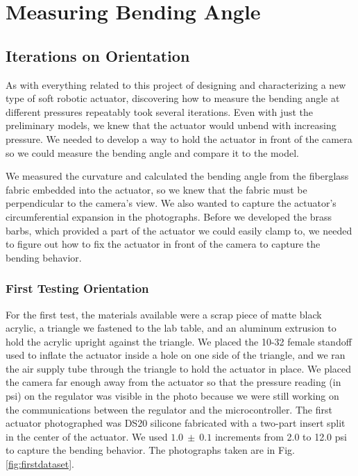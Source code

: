 \chapter{Measuring Bending Angle}

\section{Iterations on Orientation}

As with everything related to this project of designing and characterizing a new type of soft robotic actuator, discovering how to measure the bending angle at different pressures repeatably took several iterations. Even with just the preliminary models, we knew that the actuator would unbend with increasing pressure. We needed to develop a way to hold the actuator in front of the camera so we could measure the bending angle and compare it to the model. 

We measured the curvature and calculated the bending angle from the fiberglass fabric embedded into the actuator, so we knew that the fabric must be perpendicular to the camera's view. We also wanted to capture the actuator's circumferential expansion in the photographs. Before we developed the brass barbs, which provided a part of the actuator we could easily clamp to, we needed to figure out how to fix the actuator in front of the camera to capture the bending behavior. 

\subsection{First Testing Orientation}

For the first test, the materials available were a scrap piece of matte black acrylic, a triangle we fastened to the lab table, and an aluminum extrusion to hold the acrylic upright against the triangle. We placed the 10-32 female standoff used to inflate the actuator inside a hole on one side of the triangle, and we ran the air supply tube through the triangle to hold the actuator in place. We placed the camera far enough away from the actuator so that the pressure reading (in psi) on the regulator was visible in the photo because we were still working on the communications between the regulator and the microcontroller. The first actuator photographed was DS20 silicone fabricated with a two-part insert split in the center of the actuator. We used $1.0~\pm~0.1$ increments from 2.0 to 12.0 psi to capture the bending behavior. The photographs taken are in Fig. \ref{fig:firstdataset}. 


